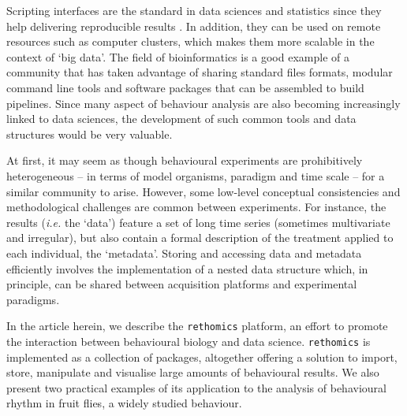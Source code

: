 \documentclass[10pt,letterpaper]{article}\usepackage[]{graphicx}\usepackage[]{color}
\begin{document}
Scripting interfaces are the standard in data sciences and statistics since they help delivering reproducible results \cite{peng_reproducible_2011,stodden_toward_2013}.
In addition, they can be used on remote resources such as computer clusters, which makes them more scalable in the context of `big data'\cite{hashem_rise_2015}.
The field of bioinformatics is a good example of a community that has taken advantage of sharing standard files formats, modular command line tools\cite{roumpeka_review_2017} and software packages\cite{huber_orchestrating_2015} that can be assembled to build pipelines\cite{leipzig_review_2017}.
Since many aspect of behaviour analysis are also becoming increasingly linked to data sciences, the development of such common tools and data structures would be very valuable.

At first, it may seem as though behavioural experiments are prohibitively heterogeneous -- in terms of model organisms, paradigm and time scale -- for a similar community to arise.
However, some low-level conceptual consistencies and methodological challenges are common between experiments.
For instance, the results (\emph{i.e.} the `data')  feature a set of long time series (sometimes multivariate and irregular), but also contain a formal description of the treatment applied to each individual, the `metadata'.
Storing and accessing data and metadata efficiently involves the implementation of a nested data structure which, in principle,
can be shared between acquisition platforms and experimental paradigms.

In the article herein, we describe the \texttt{rethomics} platform, an effort to promote the interaction between behavioural biology and data science.
\texttt{rethomics} is implemented as a collection of packages, altogether offering a solution to import, store, manipulate and visualise large amounts of behavioural results.
We also present two practical examples of its application to the analysis of behavioural rhythm in fruit flies, a widely studied behaviour.
\end{document}
